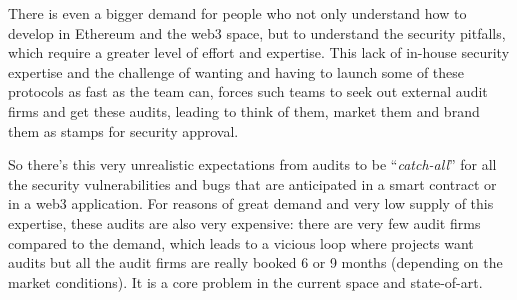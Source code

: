 There is even a bigger demand for people who not only understand how to
develop in Ethereum and the web3 space, but to understand the security
pitfalls, which require a greater level of effort and expertise. This
lack of in-house security expertise and the challenge of wanting and
having to launch some of these protocols as fast as the team can, forces
such teams to seek out external audit firms and get these audits,
leading to think of them, market them and brand them as stamps for
security approval.

So there's this very unrealistic expectations from audits to be
``\emph{catch-all}'' for all the security vulnerabilities and bugs that
are anticipated in a smart contract or in a web3 application. For
reasons of great demand and very low supply of this expertise, these
audits are also very expensive: there are very few audit firms compared
to the demand, which leads to a vicious loop where projects want audits
but all the audit firms are really booked 6 or 9 months (depending on
the market conditions). It is a core problem in the current space and
state-of-art.
